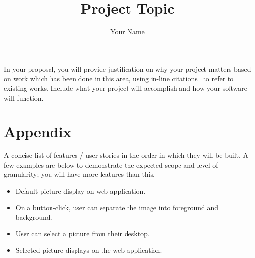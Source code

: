 \documentclass[12pt]{article}
\title{\textbf{Project Topic}}
\author{Your Name}
\begin{document}
\maketitle

In your proposal, you will provide justification on why your project matters based on work which has been done in this area, using in-line citations~\cite{clrsAlgorithms} to refer to existing works. Include what your project will accomplish and how your software will function. 


\newpage
\section*{Appendix}
A concise list of features / user stories in the order in which they will be built. A few examples are below to demonstrate the expected scope and level of granularity; you will have more features than this.
\begin{itemize}
	\item Default picture display on web application.
	\item On a button-click, user can separate the image into foreground and background.
	\item User can select a picture from their desktop.
	\item Selected picture displays on the web application.
\end{itemize}




\end{document}
